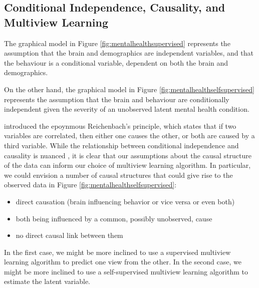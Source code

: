 \subsection{Conditional Independence, Causality, and Multiview Learning}

The graphical model in Figure \ref{fig:mentalhealthsupervised} represents the assumption that the brain and demographics are independent variables, and that the behaviour is a conditional variable, dependent on both the brain and demographics.

On the other hand, the graphical model in Figure \ref{fig:mentalhealthselfsupervised} represents the assumption that the brain and behaviour are conditionally independent given the severity of an unobserved latent mental health condition.

\citet{reichenbach1956direction} introduced the epoynmous Reichenbach's principle, which states that if two variables are correlated, then either one causes the other, or both are caused by a third variable.
While the relationship between conditional independence and causality is nuanced \citep{pearl2009causality}, it is clear that our assumptions about the causal structure of the data can inform our choice of multiview learning algorithm.
In particular, we could envision a number of causal structures that could give rise to the observed data in Figure \ref{fig:mentalhealthselfsupervised}:

\begin{itemize}
    \item direct causation (brain influencing behavior or vice versa or even both)
    \item both being influenced by a common, possibly unobserved, cause
    \item no direct causal link between them
\end{itemize}

In the first case, we might be more inclined to use a supervised multiview learning algorithm to predict one view from the other.
In the second case, we might be more inclined to use a self-supervised multiview learning algorithm to estimate the latent variable.


